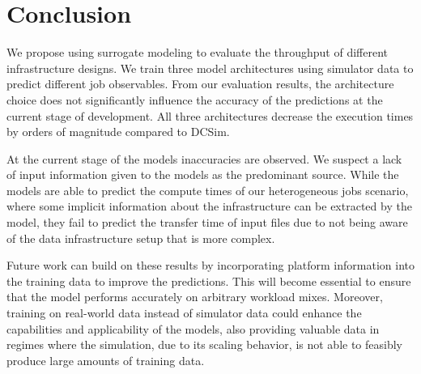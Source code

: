 \section{Conclusion}
\label{sec:conclusion}

We propose using surrogate modeling to evaluate the throughput of different infrastructure designs. 
%
We train three model architectures using simulator data to predict different job observables.
%
From our evaluation results, the architecture choice does not significantly influence the accuracy of the predictions at the current stage of development.
%
All three architectures decrease the execution times by orders of magnitude compared to DCSim.

At the current stage of the models inaccuracies are observed.
We suspect a lack of input information given to the models as the predominant source.
While the models are able to predict the compute times of our heterogeneous jobs scenario, where some implicit information about the infrastructure can be extracted by the model, they fail to predict the transfer time of input files due to not being aware of the data infrastructure setup that is more complex. 

Future work can build on these results by incorporating platform information into the training data to improve the predictions.
This will become essential to ensure that the model performs accurately on arbitrary workload mixes.
%
Moreover, training on real-world data instead of simulator data could enhance the capabilities and applicability of the models, also providing valuable data in regimes where the simulation, due to its scaling behavior, is not able to feasibly produce large amounts of training data.